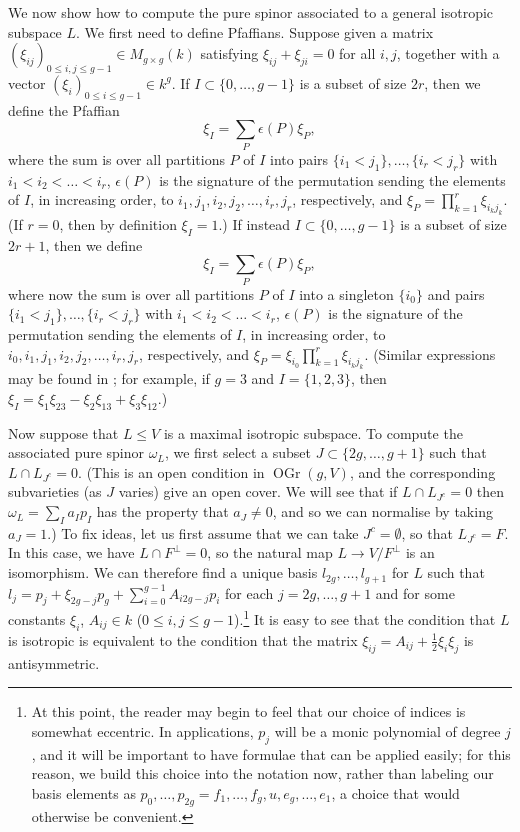 \documentclass{article} %
\numberwithin{equation}{section}
\DeclareMathOperator{\OGr}{OGr}
\begin{document}
We now show how to compute the pure spinor associated to a general isotropic subspace $L$. We first need to define Pfaffians. Suppose given a matrix $(\xi_{ij})_{0 \leq i, j \leq g-1} \in M_{g \times g}(k)$ satisfying $\xi_{ij} + \xi_{ji} = 0$ for all $i, j$, together with a vector $(\xi_i)_{0 \leq i \leq g-1} \in k^g$. If $I \subset \{ 0, \dots, g-1 \}$ is a subset of size $2r$, then we define the Pfaffian
\[ \xi_I = \sum_{P} \epsilon(P) \xi_P, \]
where the sum is over all partitions $P$ of $I$ into pairs $\{ i_1 < j_1 \}, \dots, \{ i_r < j_r \}$ with $i_1 < i_2 < \dots < i_r$, $\epsilon(P)$ is the signature of the permutation sending the elements of $I$, in increasing order, to $i_1, j_1, i_2, j_2, \dots, i_r, j_r$, respectively, and $\xi_P = \prod_{k=1}^r \xi_{i_k j_k}$. 
(If $r=0$, then by definition $\xi_I = 1$.)
If instead $I \subset \{ 0, \dots, g-1 \}$ is a subset of size $2r+1$, then we define
\[ \xi_I = \sum_P \epsilon(P) \xi_P, \]
where now the sum is over all partitions $P$ of $I$ into a singleton $\{ i_0 \}$ and pairs $\{ i_1 < j_1 \}, \dots, \{ i_r < j_r \}$ with $i_1 < i_2 < \dots < i_r$, $\epsilon(P)$ is the signature of the permutation sending the elements of $I$, in increasing order, to $i_0, i_1, j_1, i_2, j_2, \dots, i_r, j_r$, respectively, and $\xi_P = \xi_{i_0} \prod_{k=1}^r \xi_{i_k j_k}$. (Similar expressions may be found in \cite[Ch. V]{Car67}; for example, if $g = 3$ and $I = \{ 1, 2, 3 \}$, then $\xi_I = \xi_1 \xi_{23} - \xi_2 \xi_{1 3} + \xi_3 \xi_{12}$.)

Now suppose that $L \leq V$ is a maximal isotropic subspace. To compute the associated pure spinor $\omega_L$, we first select a subset $J \subset \{ 2g, \dots, g+1 \}$ such that $L \cap L_{J^c} = 0$. (This is an open condition in $\OGr(g, V)$, and the corresponding subvarieties (as $J$ varies) give an open cover. We will see that if $L \cap L_{J^c} = 0$ then $\omega_L = \sum_I a_I p_I$ has the property that $a_J \neq 0$, and so we can normalise by taking $a_J = 1$.) To fix ideas, let us first assume that we can take $J^c = \emptyset$, so that $L_{J^c} = F$. In this case, we have $L \cap F^\perp = 0$, so the natural map $L \to V / F^\perp$ is an isomorphism. We can therefore find a unique basis $l_{2g}, \dots, l_{g+1}$ for $L$ such that $l_j = p_j + \xi_{2g-j} p_g + \sum_{i=0}^{g-1} A_{i 2g-j} p_i$ for each $j = 2g, \dots, g+1$ and for some constants $\xi_i$, $A_{ij} \in k$ ($0 \leq i, j \leq g-1$).\footnote{At this point, the reader may begin to feel that our choice of indices is somewhat eccentric. In applications, $p_j$ will be a monic polynomial of degree $j$, and it will be important to have formulae that can be applied easily; for this reason, we build this choice into the notation now, rather than labeling our basis elements as $p_0, \dots, p_{2g} = f_1, \dots, f_g, u, e_g, \dots, e_1$, a choice that would otherwise be convenient.} It is easy to see that the condition that $L$ is isotropic is equivalent to the condition that the matrix $\xi_{ij} = A_{ij} + \frac{1}{2} \xi_i \xi_j$ is antisymmetric. 
\end{document}
